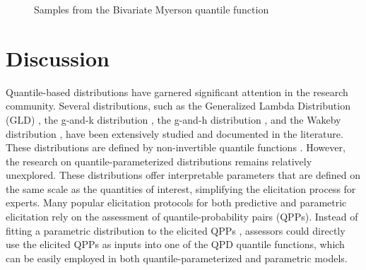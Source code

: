 \documentclass[
  fleqn,
  deca,
  blindrev
]{informs4}
\begin{document}
\begin{figure}


\caption{\label{fig-bq-myerson}Samples from the Bivariate Myerson
quantile function}

\end{figure}%

\section{Discussion}\label{discussion}

Quantile-based distributions have garnered significant attention in the
research community. Several distributions, such as the Generalized
Lambda Distribution (GLD)
\citep{freimer1988StudyGeneralizedTukey, ramberg1974ApproximateMethodGenerating},
the g-and-k distribution
\citep{haynes1997RobustnessRankingSelection, haynes2005BayesianEstimationGandk, jacob2017LikelihoodCalculationGandk, prangle2017GkPackageGandk},
the g-and-h distribution
\citep{field2006MultivariateGandhDistribution, macgillivray1992ShapePropertiesGandh, rayner2002NumericalMaximumLikelihood},
and the Wakeby distribution
\citep{jeong-soo2005WakebyDistributionMaximum, rahman2015ApplicabilityWakebyDistribution, tarsitano2005FittingWakebyModel},
have been extensively studied and documented in the literature. These
distributions are defined by non-invertible quantile functions
\citep{perepolkin2023TenetsQuantilebasedInference}. However, the
research on quantile-parameterized distributions remains relatively
unexplored. These distributions offer interpretable parameters that are
defined on the same scale as the quantities of interest, simplifying the
elicitation process for experts. Many popular elicitation protocols for
both predictive and parametric elicitation rely on the assessment of
quantile-probability pairs (QPPs). Instead of fitting a parametric
distribution to the elicited QPPs
\citep{best2020PriorElicitation, ohagan2019ExpertKnowledgeElicitation},
assessors could directly use the elicited QPPs as inputs into one of the
QPD quantile functions, which can be easily employed in both
quantile-parameterized and parametric models.
\end{document}
